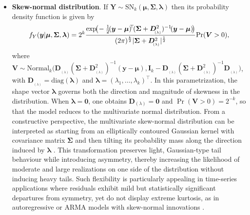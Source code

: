 \begin{itemize}
The multivariate Laplace distribution admits a convenient representation as a normal variance mixture, obtained by scaling a multivariate Gaussian vector by an independent exponential random variable \citep{AndrewsMallows1974,EltoftKimLee2006}. This construction yields an elliptically contoured distribution with finite second moments and a covariance matrix proportional to the scale matrix $\bm{\Sigma}$, while exhibiting substantially heavier tails than the multivariate normal distribution \citep[][Sec.~II.A]{EltoftKimLee2006}. When standardized to unit variance, the symmetric Laplace law is characterized by a sharper central peak and pronounced leptokurtosis relative to the Gaussian case, reflecting its greater concentration of probability mass both near the mean and in the tails \citep[][Ch.~2, Sec.~2.1.3.4]{KKP01}. From a time-series perspective, these features make Laplace innovations particularly attractive in robust modeling frameworks, as they naturally accommodate occasional jumps or double-exponential–type disturbances. Such specifications have been shown to provide improved empirical performance in ARMA and related models when the data exhibit impulsive behavior or outliers \citep{DamslethElShaarawi1989,KKP01}.

\item {\bf Skew-normal distribution}. If $\bm{Y}\sim\text{SN}_k(\bm{\mu},\bm{\Sigma},\bm{\lambda})$ then its probability density function is given by \citep[page 133]{SDB03}
$$f_{Y}(\bm{y}|\bm{\mu},\bm{\Sigma},\bm{\lambda})=2^k\dfrac{\exp\!\!\big(\!-\frac{1}{2}\!(\bm{y}-\bm{\mu})^{\!\!\top}\!(\bm{\Sigma}+\bm{D}_{_{\!\!(\lambda)}}^2)^{-1}\!(\bm{y}-\bm{\mu})\!\big)}{(2\pi)^{\frac{k}{2}}|\bm{\Sigma}+\bm{D}_{_{\!\!(\lambda)}}^2|^{\frac{1}{2}}}{\rm Pr}(\bm{V}>0),$$
where $\bm{V} \sim \text{Normal}_k\big(\!\bm{D}_{_{\!\!(\lambda)}}(\bm{\Sigma}+\bm{D}_{_{\!\!(\lambda)}}^2)^{-1}(\bm{y}-\bm{\mu}),\bm{I}_k-\bm{D}_{_{\!\!(\lambda)}}\!(\bm{\Sigma}+\bm{D}_{_{\!\!(\lambda)}}^2)^{-1}\bm{D}_{_{\!\!(\lambda)}}\!\big)$, with $\bm{D}_{_{\!\!(\lambda)}}\!=\text{diag}(\bm{\lambda})$ and $\bm{\lambda}=(\lambda_1,\ldots,\lambda_k)^{\!\top}$.
In this parametrization, the shape vector $\bm{\lambda}$ governs both the direction and magnitude of skewness in the distribution. When $\bm{\lambda} = \mathbf{0}$, one obtains $\bm{D}_{(\lambda)} = \mathbf{0}$ and $\Pr(\bm{V} > 0) = 2^{-k}$, so that the model reduces to the multivariate normal distribution. From a constructive perspective, the multivariate skew-normal distribution can be interpreted as starting from an elliptically contoured Gaussian kernel with covariance matrix $\bm{\Sigma}$ and then tilting its probability mass along the direction induced by $\bm{\lambda}$ \citep{Azzalini_2013}. This transformation preserves light, Gaussian-type tail behaviour while introducing asymmetry, thereby increasing the likelihood of moderate and large realizations on one side of the distribution without inducing heavy tails. Such flexibility is particularly appealing in time-series applications where residuals exhibit mild but statistically significant departures from symmetry, yet do not display extreme kurtosis, as in autoregressive or ARMA models with skew-normal innovations \citep{Pourahmadi2007SNTS,Azzalini_2013}.


\end{itemize}
